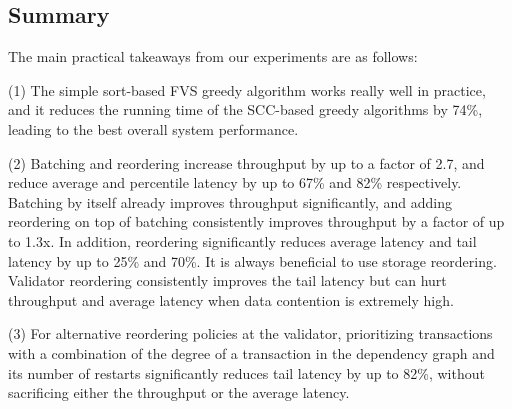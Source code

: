 
%




\subsection{Summary}

The main practical takeaways from our experiments are as follows:

(1) The simple sort-based FVS greedy algorithm works really well in practice, and it reduces the running time of the SCC-based greedy algorithms by 74\%, leading to the best overall system performance. 
 
(2) Batching and reordering increase throughput by up to a factor of 2.7, and reduce average and percentile latency by up to 67\% and 82\% respectively.
Batching by itself already improves throughput significantly, and adding reordering on top of batching consistently improves throughput by a factor of up to 1.3x. In addition, reordering significantly reduces average latency and tail latency by up to 25\% and 70\%. It is always beneficial to use storage reordering. Validator reordering consistently improves the tail latency but can hurt throughput and average latency when data contention is extremely high.

(3) For alternative reordering policies at the validator, prioritizing transactions with a combination of the degree of a transaction in the dependency graph and its number of restarts significantly reduces tail latency by up to 82\%, without sacrificing either the throughput or the average latency.


